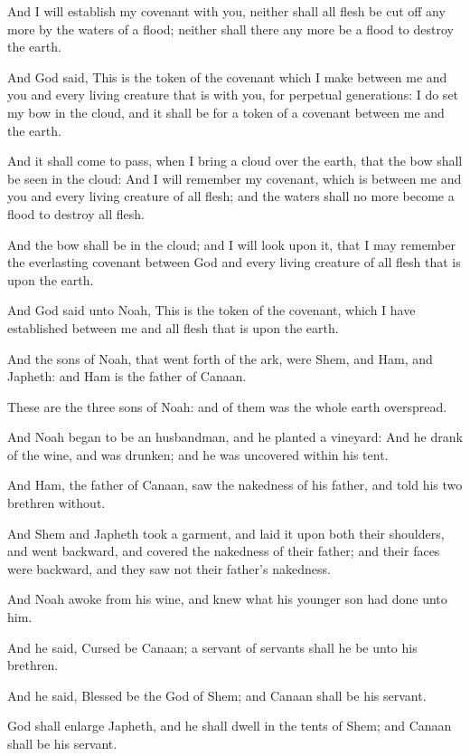 \verse And I will establish my covenant with you, neither shall all flesh be cut off any more by the waters of a flood; neither shall there any more be a flood to destroy the earth.

\verse And God said, This is the token of the covenant which I make between me and you and every living creature that is with you, for perpetual generations: \verse I do set my bow in the cloud, and it shall be for a token of a covenant between me and the earth.

\verse And it shall come to pass, when I bring a cloud over the earth, that the bow shall be seen in the cloud: \verse And I will remember my covenant, which is between me and you and every living creature of all flesh; and the waters shall no more become a flood to destroy all flesh.

\verse And the bow shall be in the cloud; and I will look upon it, that I may remember the everlasting covenant between God and every living creature of all flesh that is upon the earth.

\verse And God said unto Noah, This is the token of the covenant, which I have established between me and all flesh that is upon the earth.

\verse And the sons of Noah, that went forth of the ark, were Shem, and Ham, and Japheth: and Ham is the father of Canaan.

\verse These are the three sons of Noah: and of them was the whole earth overspread.

\verse And Noah began to be an husbandman, and he planted a vineyard: \verse And he drank of the wine, and was drunken; and he was uncovered within his tent.

\verse And Ham, the father of Canaan, saw the nakedness of his father, and told his two brethren without.

\verse And Shem and Japheth took a garment, and laid it upon both their shoulders, and went backward, and covered the nakedness of their father; and their faces were backward, and they saw not their father's nakedness.

\verse And Noah awoke from his wine, and knew what his younger son had done unto him.

\verse And he said, Cursed be Canaan; a servant of servants shall he be unto his brethren.

\verse And he said, Blessed be the \LORD God of Shem; and Canaan shall be his servant.

\verse God shall enlarge Japheth, and he shall dwell in the tents of Shem; and Canaan shall be his servant.

